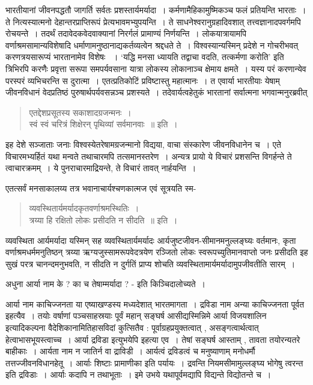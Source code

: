{भारतीयानां जीवनपद्धतौ जागर्ति सर्वतः प्रशस्तार्यमर्यादा~। कर्मणामैहिकामुष्मिकञ्च फलं प्रतियन्ति भारताः~। ते नित्यस्यात्मनो देहान्तरप्राप्तिरूपं प्रेत्यभावमभ्युपयन्ति~। ते साधने\-श्वरानुग्रहादिवशात् तत्त्वज्ञानादपवर्गमपि रोचयन्ते~। तदर्थं तदावेदकवेदवाक्यानां निरर्गलं \-प्रामाण्यं निर्णयन्ति~। लोकयात्रायामपि वर्णाश्रमसामान्यविशेषादि धर्माणामनुष्ठानाद्य\-कर्तव्यत्वेन श्रद्दधते ते~। विश्वस्यान्यस्मिन् प्रदेशे न गोचरीभवत् करणत्रयसारूप्यं भारतानामेव विशेषः ~। ‘यद्धि मनसा ध्यायति  तद्वाचा वदति, तत्कर्मणा करोति’ इति त्रिभिरपि करणैः प्रवृत्ता सरूपा समपर्यवसाना यात्रा लोकस्य लोकानाञ्च क्षेमाय क्षमते~। यस्य परं करणान्येव परस्परं व्यभिचरन्ति स दुरात्मा~। एतत्प्रतिकोटिं प्रविष्टास्तु महात्मानः~। त एवार्या भारतीयाः येषाम् जीवनविधानं वेदप्रतिष्ठं पुरुषार्थपर्यवसन्नञ्च प्रशस्यते~। तदेवार्यत्वहेतुकं भारतानां सर्वात्मना भगवान्मनुरब्रवीत्  
\begin{verse}
एतद्देशप्रसूतस्य सकाशादग्रजन्मनः~। \\
स्वं स्वं चरित्रं शिक्षेरन् पृथिव्यां सर्वमानवाः~॥ इति~। 
\end{verse}
इह देशे सञ्जाताः जनाः विश्वस्येतरेषामग्रजन्मानो विद्यया, वाचा संस्कारेण जीवनविधानेन च~। एते विचारमभ्यर्हितं यथा मन्वते तथाचारमपि तत्समानस्तरेण~। अन्यत्र प्रायो ये विचारं प्रशसन्ति विगर्हन्ते ते त्वाचारक्रमम्~। ये पुनराचारमाद्रियन्ते, ते विचारं तावत् नार्हयन्ति~। 

एतत्सर्वं मनसाकालय्य तत्र भवानाचार्यश्चणकात्मज एवं सूत्रयति स्म-
\begin{verse}
व्यवस्थितार्यमर्यादकृतवर्णाश्रमस्थितिः~। \\
त्रय्या हि रक्षितो लोकः प्रसीदति न सीदति~॥ इति~। 
\end{verse}
व्यवस्थिता आर्यमर्यादा यस्मिन् सह व्यवस्थितार्यमर्यादः आर्यजुष्टजीवन-सीमान\-मनुल्लङ्घ्यः वर्तमानः, कृता वर्णाश्रमधर्ममनुतिष्ठन् त्रय्या ऋग्यजुस्सामरूपवेदत्रयेण रञ्जितो लोकः स्वरूपच्युतिमानवाप्तो जनः प्रसीदति इह सुखं परत्र चानन्दमनुभवति, न सीदति न दुर्गतिं प्राप्य शोचति व्यवस्थितामार्यमर्यादामुपजीवतीति सारम्~। 

अधुना आर्या नाम के ? का च तेषाम्मर्यादा ? - इति किञ्चिदालोच्यते~। 

आर्या नाम काचिज्जनता या एष्याखण्डस्य मध्यदेशात् भारतमागता~। द्रविडा नाम अन्या काचिज्जनता पूर्वत इहत्यैव~। तयोः वर्षाणां पञ्चसाहस्रयाः पूर्वं महान् सङ्घर्ष आसीद्यस्मिन्निमे आर्या विजयशालिन इत्यादिकल्पना वैदेशिकानामितिहासविदां कुत्सितैव : पूर्वाग्रहप्रयुक्तत्वात् , असङ्गत्वार्थत्वात् हेत्वाभासभूयस्त्वाच्च~। आर्या द्रविडा इत्युभयेपि इहत्या एव~। तेषां सङ्घर्ष आस्ताम् , तावता तयोरन्यतरे बाहीकाः~। आर्यता नाम न जातिर्न वा द्राविडी~। आर्यत्वं द्रविडत्वं च मनुष्याणाम् मनोधर्मौ तत्तज्जीवनविधानहेतू~। आर्याः शिष्टाः प्रामाणीका इति पर्यायः~। द्रवन्ति नियमसीमामुल्लङ्घ्य भोगेषु त्वरन्त इति द्रविडाः~। आर्याः कदापि न तथाभूताः~। इमे उभये यथापूर्वमद्यापि विद्यन्ते विद्योतन्ते च~। 

}
